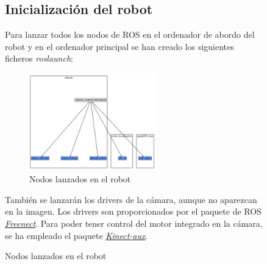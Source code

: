 \begin{figure}[!ht]
\newpage
\subsection{Inicialización del robot}
Para lanzar todos los nodos de ROS en el ordenador de abordo del robot y en el ordenador principal se han creado los siguientes ficheros \textit{roslaunch}:
    \begin{figure}[!ht]
        \centering
        \includegraphics[width=0.6\textwidth]{images/whee}
        \caption{Nodos lanzados en el robot}
    \end{figure}

También se lanzarán los drivers de la cámara, aunque no aparezcan en la imagen. Los drivers son proporcionados por el 
paquete de ROS \textit{\href{https://github.com/ros-drivers/freenect\_stack}{Freenect}}.
Para poder tener control del motor integrado en la cámara, se ha empleado el paquete \textit{\href{https://github.com/muhrix/kinect_aux}{Kinect-aux}}.
    

\end{figure}
